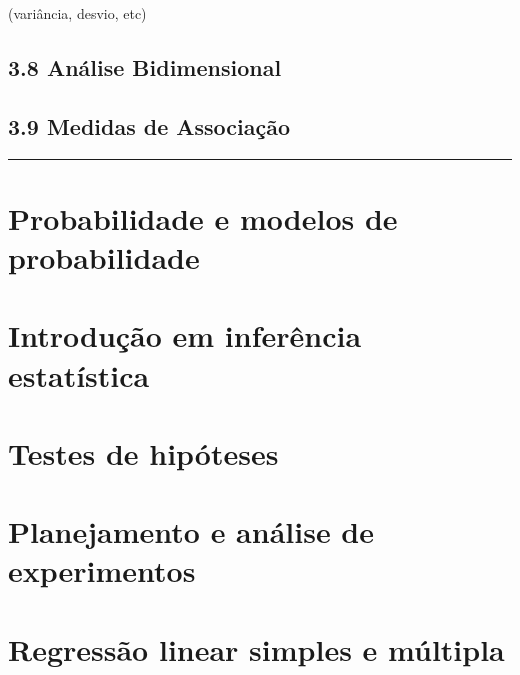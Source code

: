 \documentclass[
]{book}
\theoremstyle{definition}
\theoremstyle{definition}
\theoremstyle{definition}
\theoremstyle{definition}
\theoremstyle{remark}
\begin{document}
(variância, desvio, etc)

\hypertarget{anuxe1lise-bidimensional}{%
\section{3.8 Análise Bidimensional}\label{anuxe1lise-bidimensional}}

\hypertarget{medidas-de-associauxe7uxe3o}{%
\section{3.9 Medidas de Associação}\label{medidas-de-associauxe7uxe3o}}

\begin{center}\rule{0.5\linewidth}{0.5pt}\end{center}

\hypertarget{probabilidade-e-modelos-de-probabilidade}{%
\chapter{Probabilidade e modelos de probabilidade}\label{probabilidade-e-modelos-de-probabilidade}}

\hypertarget{introduuxe7uxe3o-em-inferuxeancia-estatuxedstica}{%
\chapter{Introdução em inferência estatística}\label{introduuxe7uxe3o-em-inferuxeancia-estatuxedstica}}

\hypertarget{testes-de-hipuxf3teses}{%
\chapter{Testes de hipóteses}\label{testes-de-hipuxf3teses}}

\hypertarget{planejamento-e-anuxe1lise-de-experimentos}{%
\chapter{Planejamento e análise de experimentos}\label{planejamento-e-anuxe1lise-de-experimentos}}

\hypertarget{regressuxe3o-linear-simples-e-muxfaltipla}{%
\chapter{Regressão linear simples e múltipla}\label{regressuxe3o-linear-simples-e-muxfaltipla}}
\end{document}
